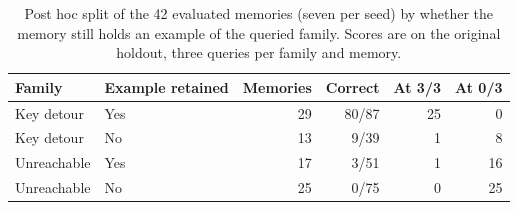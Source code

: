 \begin{table}[H]
\centering
\caption{Post hoc split of the 42 evaluated memories (seven per seed) by
whether the memory still holds an example of the queried family. Scores
are on the original holdout, three queries per family and memory.}
\label{tab:coverage-readout}
\begin{tabular}{llrrrr}
\toprule
Family & Example retained & Memories & Correct & At 3/3 & At 0/3 \\
\midrule
Key detour & Yes & 29 & 80/87 & 25 & 0 \\
Key detour & No & 13 & 9/39 & 1 & 8 \\
Unreachable & Yes & 17 & 3/51 & 1 & 16 \\
Unreachable & No & 25 & 0/75 & 0 & 25 \\
\bottomrule
\end{tabular}
\end{table}
